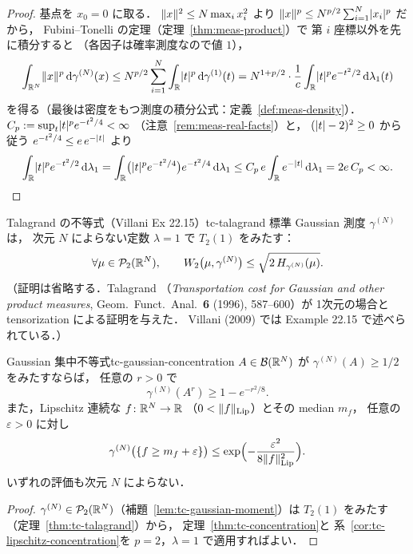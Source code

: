\begin{proof}
  基点を $x_0=0$ に取る．
  $\lVert x \rVert^2\leq N\max_ix_i^2$ より
  $\lVert x \rVert^p\leq N^{p/2}\sum_{i=1}^N\lvert x_i \rvert^p$ だから，
  Fubini--Tonelli の定理（定理~\ref{thm:meas-product}）で
  第 $i$ 座標以外を先に積分すると
  （各因子は確率測度なので値 $1$），
  \[
    \int_{\mathbb{R}^N}\lVert x \rVert^p\,\mathrm{d}\gamma^{(N)}(x)
    \leq N^{p/2}\sum_{i=1}^N\int_{\mathbb{R}}\lvert t \rvert^p\,\mathrm{d}\gamma^{(1)}(t)
    =N^{1+p/2}\cdot\frac1c\int_{\mathbb{R}}\lvert t \rvert^pe^{-t^2/2}\,\mathrm{d}\lambda_1(t)
  \]
  を得る（最後は密度をもつ測度の積分公式：定義~\ref{def:meas-density}）．
  $C_p:=\sup_t\lvert t \rvert^pe^{-t^2/4}<\infty$
  （注意~\ref{rem:meas-real-facts}）と，
  $(\lvert t \rvert-2)^2\geq0$ から従う
  $e^{-t^2/4}\leq e\,e^{-\lvert t \rvert}$ より
  \[
    \int_{\mathbb{R}}\lvert t \rvert^pe^{-t^2/2}\,\mathrm{d}\lambda_1
    =\int_{\mathbb{R}}\bigl(\lvert t \rvert^pe^{-t^2/4}\bigr)e^{-t^2/4}\,\mathrm{d}\lambda_1
    \leq C_p\,e\int_{\mathbb{R}} e^{-\lvert t \rvert}\,\mathrm{d}\lambda_1
    =2e\,C_p<\infty.  \qedhere
  \]
\end{proof}

\begin{theorem}{Talagrand の不等式（Villani Ex 22.15）}{tc-talagrand}
  標準 Gaussian 測度 $\gamma^{(N)}$ は，
  次元 $N$ によらない定数 $\lambda=1$ で $T_2(1)$ をみたす：
  \[
    \forall\mu\in\mathcal{P}_{2}(\mathbb{R}^N),\qquad
    W_2\bigl(\mu,\gamma^{(N)}\bigr)
    \leq\sqrt{2\,H_{\gamma^{(N)}}(\mu)}.
  \]
  （証明は省略する．Talagrand
  （\emph{Transportation cost for Gaussian and other product measures},
  Geom.\ Funct.\ Anal.\ \textbf{6} (1996), 587--600）が
  1次元の場合と tensorization による証明を与えた．
  Villani (2009) では Example 22.15 で述べられている．）
\end{theorem}

\begin{corollary}{Gaussian 集中不等式}{tc-gaussian-concentration}
  $A\in\mathcal{B}(\mathbb{R}^N)$ が $\gamma^{(N)}(A)\geq1/2$ をみたすならば，
  任意の $r>0$ で
  \[
    \gamma^{(N)}(A^r)\geq1-e^{-r^2/8}.
  \]
  また，Lipschitz 連続な $f\colon\mathbb{R}^N\to\mathbb{R}$
  （$0<\lVert f \rVert_{\operatorname{Lip}}$）とその median $m_f$，
  任意の $\varepsilon>0$ に対し
  \[
    \gamma^{(N)}\bigl(\{f\geq m_f+\varepsilon\}\bigr)
    \leq\exp\Bigl(-\frac{\varepsilon^2}{8\lVert f \rVert_{\operatorname{Lip}}^2}\Bigr).
  \]
  いずれの評価も次元 $N$ によらない．
\end{corollary}

\begin{proof}
  $\gamma^{(N)}\in\mathcal{P}_{2}(\mathbb{R}^N)$（補題~\ref{lem:tc-gaussian-moment}）は
  $T_2(1)$ をみたす（定理~\ref{thm:tc-talagrand}）から，
  定理~\ref{thm:tc-concentration}と
  系~\ref{cor:tc-lipschitz-concentration}を
  $p=2$，$\lambda=1$ で適用すればよい．
\end{proof}

